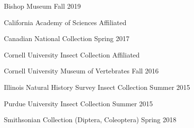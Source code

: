 

\begin{cvskills}

  \cvskill
    {Bishop Museum} %
    {Fall 2019} %

  \cvskill
    {California Academy of Sciences} %
    {Affiliated} %

  \cvskill
    {Canadian National Collection} %
    {Spring 2017} %

  \cvskill
    {Cornell University Insect Collection} %
    {Affiliated} %

  \cvskill
    {Cornell University Museum of Vertebrates} %
    {Fall 2016} %

  \cvskill
    {Illinois Natural History Survey Insect Collection} %
    {Summer 2015} %

  \cvskill
    {Purdue University Insect Collection} %
    {Summer 2015} %

  \cvskill
    {Smithsonian Collection (Diptera, Coleoptera)} %
    {Spring 2018} %


\end{cvskills}
